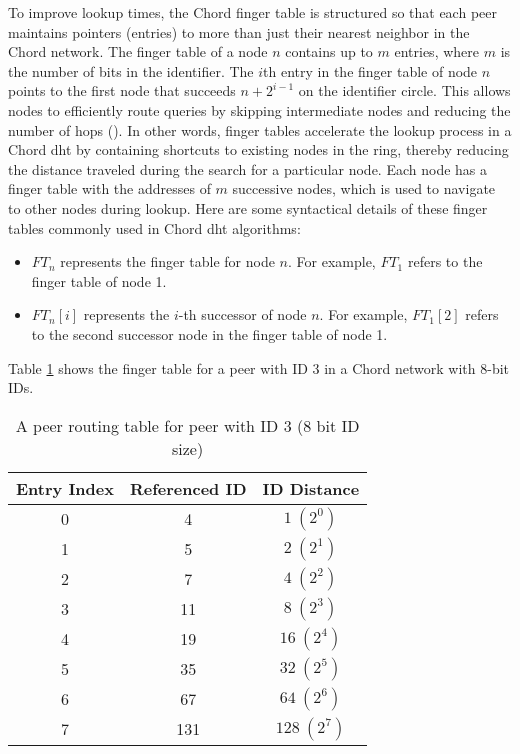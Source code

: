 To improve lookup times, the Chord finger table is structured so that each peer maintains pointers (entries) to more than just their nearest neighbor in the Chord network.
The finger table of a node \(n\) contains up to \(m\) entries, where \(m\) is the number of bits in the identifier.
The \(i\)th entry in the finger table of node \(n\) points to the first node that succeeds \(n + 2^{i-1}\) on the identifier circle.
This allows nodes to efficiently route queries by skipping intermediate nodes and reducing the number of hops (\cite{stoica2001}).
In other words, finger tables accelerate the lookup process in a Chord \gls{dht} by containing shortcuts to existing nodes in the ring, thereby reducing the distance traveled during the search for a particular node.
Each node has a finger table with the addresses of $m$ successive nodes, which is used to navigate to other nodes during lookup.
Here are some syntactical details of these finger tables commonly used in Chord \gls{dht} algorithms:
\begin{itemize}
    \item $FT_n$ represents the finger table for node $n$.
    For example, $FT_1$ refers to the finger table of node 1.
	\item $FT_n[i]$ represents the $i$-th successor of node $n$.
    For example, $FT_1[2]$ refers to the second successor node in the finger table of node 1.
\end{itemize}
Table \ref{tab:peer-routing-table} shows the finger table for a peer with ID 3 in a Chord network with 8-bit IDs.
\begin{table}[htbp]
    \centering
    \begin{tabular}{|c|c|c|}
        \hline
        \textbf{Entry Index} & \textbf{Referenced ID} & \textbf{ID Distance} \\ \hline
        0 & 4 & $1 \ (2^0)$ \\ \hline
        1 & 5 & $2 \ (2^1)$ \\ \hline
        2 & 7 & $4 \ (2^2)$ \\ \hline
        3 & 11 & $8 \ (2^3)$ \\ \hline
        4 & 19 & $16 \ (2^4)$ \\ \hline
        5 & 35 & $32 \ (2^5)$ \\ \hline
        6 & 67 & $64 \ (2^6)$ \\ \hline
        7 & 131 & $128 \ (2^7)$ \\ \hline
    \end{tabular}
    \caption{A peer routing table for peer with ID 3 (8 bit ID size)}
    \label{tab:peer-routing-table}
\end{table}

